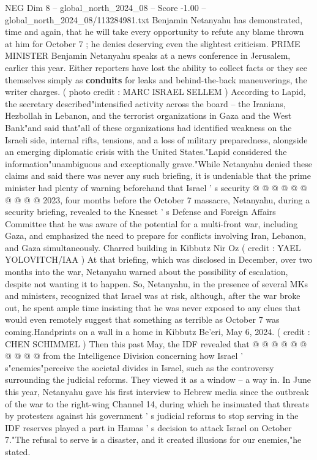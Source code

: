 \begin{textsample}{NEG Dim 8 – global\_north\_2024\_08 – Score -1.00 – global\_north\_2024\_08/113284981.txt}  \label{ex:f8_neg_120}
Benjamin Netanyahu has demonstrated, time and again, that he will take every opportunity to refute any blame thrown at him for October 7 ; he denies deserving even the slightest criticism.
PRIME MINISTER Benjamin Netanyahu speaks at a news conference in Jerusalem, earlier this year.
Either reporters have lost the ability to collect facts or they see themselves simply as \textbf{conduits} for leaks and behind-the-back maneuverings, the writer charges. ( photo credit : MARC ISRAEL SELLEM ) According to Lapid, the secretary described"intensified activity across the board -- the Iranians, Hezbollah in Lebanon, and the terrorist organizations in Gaza and the West Bank"and said that"all of these organizations had identified weakness on the Israeli side, internal rifts, tensions, and a loss of military preparedness, alongside an emerging diplomatic crisis with the United States."Lapid considered the information"unambiguous and exceptionally grave."While Netanyahu denied these claims and said there was never any such briefing, it is undeniable that the prime minister had plenty of warning beforehand that Israel ' s security @ @ @ @ @ @ @ @ @ @ 2023, four months before the October 7 massacre, Netanyahu, during a security briefing, revealed to the Knesset ' s Defense and Foreign Affairs Committee that he was aware of the potential for a multi-front war, including Gaza, and emphasized the need to prepare for conflicts involving Iran, Lebanon, and Gaza simultaneously.
Charred building in Kibbutz Nir Oz ( credit : YAEL YOLOVITCH/IAA ) At that briefing, which was disclosed in December, over two months into the war, Netanyahu warned about the possibility of escalation, despite not wanting it to happen.
So, Netanyahu, in the presence of several MKs and ministers, recognized that Israel was at risk, although, after the war broke out, he spent ample time insisting that he was never exposed to any clues that would even remotely suggest that something as terrible as October 7 was coming.Handprints on a wall in a home in Kibbutz Be'eri, May 6, 2024. ( credit : CHEN SCHIMMEL ) Then this past May, the IDF revealed that @ @ @ @ @ @ @ @ @ @ from the Intelligence Division concerning how Israel ' s"enemies"perceive the societal divides in Israel, such as the controversy surrounding the judicial reforms.
They viewed it as a window -- a way in.
In June this year, Netanyahu gave his first interview to Hebrew media since the outbreak of the war to the right-wing Channel 14, during which he insinuated that threats by protesters against his government ' s judicial reforms to stop serving in the IDF reserves played a part in Hamas ' s decision to attack Israel on October 7."The refusal to serve is a disaster, and it created illusions for our enemies,"he stated.

\end{textsample}
